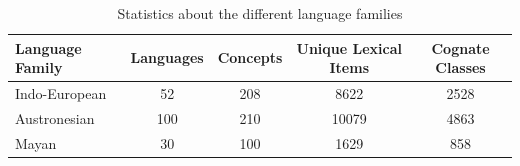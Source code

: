 \documentclass[11pt,letterpaper]{article}
\begin{document}
\begin{table}[ht]
\centering
\begin{tabular}{|l|c|c|c|c|}
\hline
\textbf{Language Family} & \textbf{Languages} & \textbf{Concepts} & \textbf{Unique Lexical Items} & \textbf{Cognate Classes} \\ \hline
Indo-European   & 52        & 208      & 8622                & 2528            \\
Austronesian    & 100       & 210      & 10079                & 4863            \\
Mayan           & 30        & 100      & 1629                 & 858          \\ \hline  
\end{tabular}
\caption{Statistics about the different language families}
\label{datastat}
\end{table}
\end{document}
